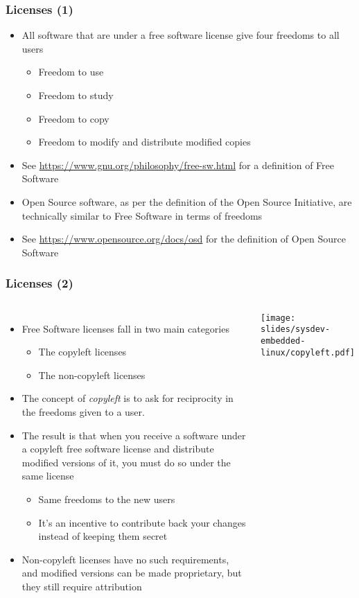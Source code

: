 \begin{frame}
  \frametitle{Licenses (1)}
  \begin{itemize}
  \item All software that are under a free software license give four
    freedoms to all users
    \begin{itemize}
    \item Freedom to use
    \item Freedom to study
    \item Freedom to copy
    \item Freedom to modify and distribute modified copies
    \end{itemize}
  \item See \url{https://www.gnu.org/philosophy/free-sw.html} for a
    definition of Free Software
  \item Open Source software, as per the definition of the Open Source
    Initiative, are technically similar to Free Software in terms of
    freedoms
  \item See \url{https://www.opensource.org/docs/osd} for the definition of
    Open Source Software
  \end{itemize}
\end{frame}

\begin{frame}
  \frametitle{Licenses (2)}
  \begin{columns}
    \begin{itemize}
      \item Free Software licenses fall in two main categories
      \begin{itemize}
      \item The copyleft licenses
      \item The non-copyleft licenses
      \end{itemize}
    \item The concept of {\em copyleft} is to ask for reciprocity in the
      freedoms given to a user.
    \item The result is that when you receive a software under a
      copyleft free software license and distribute modified versions of
      it, you must do so under the same license
      \begin{itemize}
      \item Same freedoms to the new users
      \item It's an incentive to contribute back your changes instead of
        keeping them secret
      \end{itemize}
    \item Non-copyleft licenses have no such requirements, and modified
      versions can be made proprietary, but they still require
      attribution
    \end{itemize}
    \texttt{[image: slides/sysdev-embedded-linux/copyleft.pdf]}
  \end{columns}
\end{frame}

